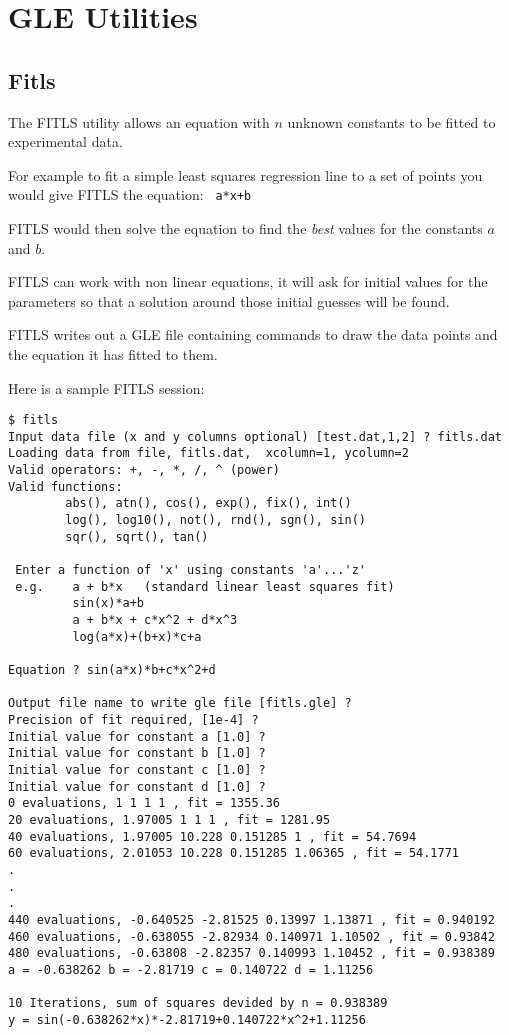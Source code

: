 \chapter {GLE Utilities}
\label{util:chap}
\section{Fitls}
The FITLS utility allows an equation with $n$ unknown constants to 
be fitted to experimental data.

For example to fit a simple least squares regression line to a set of 
points you would give FITLS the equation: \verb# a*x+b#

FITLS would then solve the equation to find the {\em best} values for
the constants $a$ and $b$. 

FITLS can work with non linear equations, it will ask for initial
values for the parameters so that a solution around those initial
guesses will be found.

FITLS writes out a GLE file containing commands to draw the data
points and the equation it has fitted to them.

Here is a sample FITLS session:
\begin{verbatim}
$ fitls
Input data file (x and y columns optional) [test.dat,1,2] ? fitls.dat
Loading data from file, fitls.dat,  xcolumn=1, ycolumn=2
Valid operators: +, -, *, /, ^ (power) 
Valid functions:
        abs(), atn(), cos(), exp(), fix(), int()
        log(), log10(), not(), rnd(), sgn(), sin()
        sqr(), sqrt(), tan()

 Enter a function of 'x' using constants 'a'...'z' 
 e.g.    a + b*x   (standard linear least squares fit) 
         sin(x)*a+b 
         a + b*x + c*x^2 + d*x^3  
         log(a*x)+(b+x)*c+a 

Equation ? sin(a*x)*b+c*x^2+d

Output file name to write gle file [fitls.gle] ?
Precision of fit required, [1e-4] ?
Initial value for constant a [1.0] ? 
Initial value for constant b [1.0] ? 
Initial value for constant c [1.0] ? 
Initial value for constant d [1.0] ? 
0 evaluations, 1 1 1 1 , fit = 1355.36 
20 evaluations, 1.97005 1 1 1 , fit = 1281.95 
40 evaluations, 1.97005 10.228 0.151285 1 , fit = 54.7694 
60 evaluations, 2.01053 10.228 0.151285 1.06365 , fit = 54.1771 
.
.
.
440 evaluations, -0.640525 -2.81525 0.13997 1.13871 , fit = 0.940192 
460 evaluations, -0.638055 -2.82934 0.140971 1.10502 , fit = 0.93842 
480 evaluations, -0.63808 -2.82357 0.140993 1.10452 , fit = 0.938389 
a = -0.638262 b = -2.81719 c = 0.140722 d = 1.11256 

10 Iterations, sum of squares devided by n = 0.938389
y = sin(-0.638262*x)*-2.81719+0.140722*x^2+1.11256
\end{verbatim}
\vspace*{1.0cm}
